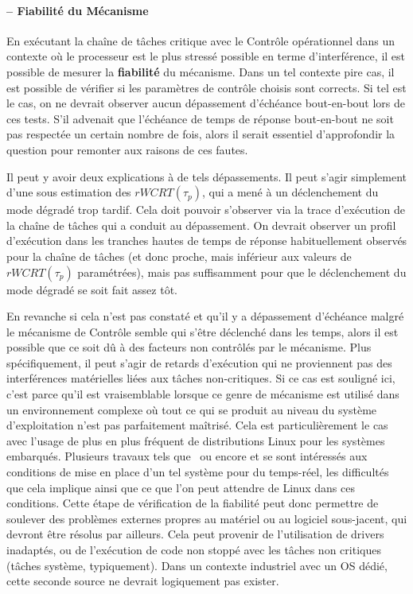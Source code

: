 \documentclass[french, a4paper, 11pt, twoside, pdftex]{StyleThese}
\begin{document}
    	\paragraph{ -- Fiabilité du Mécanisme}
        En exécutant la chaîne de tâches critique avec le Contrôle opérationnel dans un contexte où le processeur est le plus stressé possible en terme d'interférence, il est possible de mesurer la \textbf{fiabilité} du mécanisme.
        Dans un tel contexte pire cas, il est possible de vérifier si les paramètres de contrôle choisis sont corrects. Si tel est le cas, on ne devrait observer aucun dépassement d'échéance bout-en-bout lors de ces tests. 
        S'il advenait que l'échéance de temps de réponse bout-en-bout ne soit pas respectée un certain nombre de fois, alors il serait essentiel d'approfondir la question pour remonter aux raisons de ces fautes.
        
		Il peut y avoir deux explications à de tels dépassements. Il peut s'agir simplement d'une sous estimation des $rWCRT(\tau_p) $, qui a mené à un déclenchement du mode dégradé trop tardif.
        Cela doit pouvoir s'observer via la trace d'exécution de la chaîne de tâches qui a conduit au dépassement. On devrait observer un profil d'exécution dans les tranches hautes de temps de réponse habituellement observés pour la chaîne de tâches (et donc proche, mais inférieur aux valeurs de $rWCRT(\tau_p)$ paramétrées), mais pas suffisamment pour que le déclenchement du mode dégradé se soit fait assez tôt.
        
        En revanche si cela n'est pas constaté et qu'il y a dépassement d'échéance malgré le mécanisme de Contrôle semble qui s'être déclenché dans les temps, alors il est possible que ce soit dû à des facteurs non contrôlés par le mécanisme. Plus spécifiquement, il peut s'agir de retards d'exécution qui ne proviennent pas des interférences matérielles liées aux tâches non-critiques.
        Si ce cas est souligné ici, c'est parce qu'il est vraisemblable lorsque ce genre de mécanisme est utilisé dans un environnement complexe où tout ce qui se produit au niveau du système d'exploitation n'est pas parfaitement maîtrisé. Cela est particulièrement le cas avec l'usage de plus en plus fréquent de distributions Linux pour les systèmes embarqués. Plusieurs travaux tels que~\cite{allende_towards_2019} ou encore \cite{sivakumar_automotive_2020} et \cite{serra_architecture_2020} se sont intéressés aux conditions de mise en place d'un tel système pour du temps-réel, les difficultés que cela implique ainsi que ce que l'on peut attendre de Linux dans ces conditions. Cette étape de vérification de la fiabilité peut donc permettre de soulever des problèmes externes propres au matériel ou au logiciel sous-jacent, qui devront être résolus par ailleurs. Cela peut provenir de l'utilisation de drivers inadaptés, ou de l'exécution de code non stoppé avec les tâches non critiques (tâches système, typiquement). Dans un contexte industriel avec un OS dédié, cette seconde source ne devrait logiquement pas exister. 
                    
\end{document}
